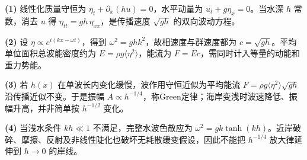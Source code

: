 \par\noindent\textbf{(1)} 线性化质量守恒为 \(\eta_t+\partial_x(hu)=0\)，水平动量为 \(u_t+g\eta_x=0\)。当水深 \(h\) 常数，消去 \(u\) 得 \(\eta_{tt}=gh\,\eta_{xx}\)，是传播速度 \(\sqrt{gh}\) 的双向波动方程。
\par\noindent\textbf{(2)} 设 \(\eta\propto e^{i(kx-\omega t)}\)，得到 \(\omega^2=ghk^2\)，故相速度与群速度都为 \(c=\sqrt{gh}\)。平均单位面积总波能密度约为 \(E=\rho g\langle\eta^2\rangle\)，能流为 \(F=Ec\)，需同时计入等量的动能和重力势能。
\par\noindent\textbf{(3)} 若 \(h(x)\) 在单波长内变化缓慢，波作用守恒近似为平均能流 \(F=\rho g\langle\eta^2\rangle\sqrt{gh}\) 沿传播近似不变。于是振幅 \(A\propto h^{-1/4}\)，称Green定律；海岸变浅时波速降低、振幅升高，并非简单按 \(h^{-1/2}\) 变化。
\par\noindent\textbf{(4)} 当浅水条件 \(kh\ll1\) 不满足，完整水波色散应为 \(\omega^2=gk\tanh(kh)\)。近岸破碎、摩擦、反射及非线性陡化也破坏无耗散缓变假设，因此不能把 \(h^{-1/4}\) 放大律延伸到 \(h\to0\) 的岸线。
